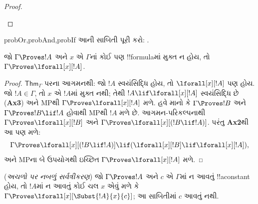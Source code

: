 \documentclass[../../../include/open-logic-section]{subfiles}
\begin{document}
\begin{proof}
\begin{enumerate}

\end{enumerate} 
\end{proof}

\begin{probtag}{probOr,probAnd,probIf} આની સાબિતી પૂરી કરો:
. 
\end{probtag}

\begin{thm}[સર્વત્રીકરણ]  જો $\Gamma \Proves
!A$ અને $x$ એ $\Gamma$નાં કોઈ પણ !!{formula}માં મુક્ત ન હોય,
તો $\Gamma \Proves \lforall[x][!A]$.
\end{thm}

\begin{proof} $\mathsf{Thm}_\Gamma$ પરના આગમનથી:
જો $!A$ સ્વયંસિદ્ધિ હોય, તો
$\lforall[x][!A]$ પણ હોય.
જો $!A\in \Gamma$, તો $x$ એ $!A$માં મુક્ત
નથી; તેથી $!A \lif \lforall[x][!A]$
સ્વયંસિદ્ધિ છે (\textbf{Ax3}) અને MPથી
$\Gamma \Proves \lforall[x][!A]$ મળે.
હવે માનો કે $\Gamma \Proves !B$ અને
$\Gamma \Proves !B \lif !A$ હોવાથી
MPથી $!A$ મળે છે. આગમન-પરિકલ્પનાથી
$\Gamma \Proves \lforall[x][!B]$ અને
$\Gamma \Proves \lforall[x][( !B \lif !A)]$.
પરંતુ \textbf{Ax2}થી આ પણ મળે:
\[ \Gamma \Proves
\lforall[x][( !B \lif !A)] \lif (\lforall[x][ !B] \lif \lforall[x][!A]), \]
અને MPના બે ઉપયોગથી ઇચ્છિત
$\Gamma \Proves \lforall[x][!A]$ મળે. \end{proof}

\begin{thm} (\emph{અચળો પર નબળું સર્વત્રીકરણ})
જો $\Gamma \Proves !A$ અને $c$ એ $\Gamma$માં
ન આવતું !!a{constant} હોય, તો $!A$માં
ન આવતું કોઈ ચલ $x$ એવું મળે કે
$\Gamma \Proves \lforall[x][\Subst{!A}{x}{c}]$;
આ સાબિતીમાં $c$ આવતું નથી.
\end{thm}
\end{document}
